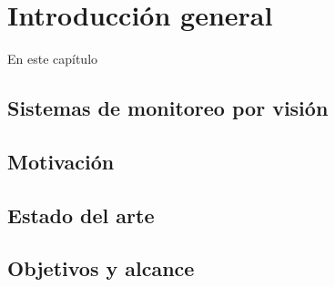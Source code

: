
\chapter{Introducción general} %

\label{Chapter1} %
\label{IntroGeneral}

En este capítulo


\section{Sistemas de monitoreo por visión}
\label{sec:sistemasVision}


\section{Motivación}
\label{sec:motivacion}


\section{Estado del arte}
\label{sec:estadoDelArte}


\section{Objetivos y alcance}
\label{sec:objetivosAlcance}


